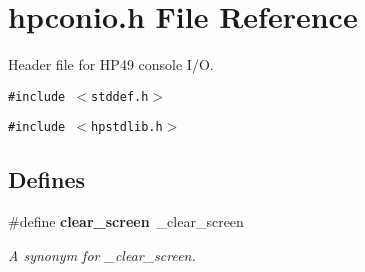 \section{hpconio.h File Reference}
\label{hpconio_8h}
Header file for HP49 console I/O. 


{\tt \#include $<$stddef.h$>$}\par
{\tt \#include $<$hpstdlib.h$>$}\par
\subsection*{Defines}
\begin{CompactItemize}
\item 
\#define {\bf clear\_\-screen}\ \_\-clear\_\-screen
\begin{CompactList}\small\item\em A synonym for \_\-clear\_\-screen.\item\end{CompactList}\end{CompactItemize}
